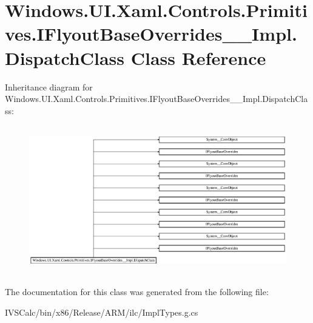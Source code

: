 \hypertarget{class_windows_1_1_u_i_1_1_xaml_1_1_controls_1_1_primitives_1_1_i_flyout_base_overrides_____impl_1_1_dispatch_class}{}\section{Windows.\+U\+I.\+Xaml.\+Controls.\+Primitives.\+I\+Flyout\+Base\+Overrides\+\_\+\+\_\+\+Impl.\+Dispatch\+Class Class Reference}
\label{class_windows_1_1_u_i_1_1_xaml_1_1_controls_1_1_primitives_1_1_i_flyout_base_overrides_____impl_1_1_dispatch_class}
Inheritance diagram for Windows.\+U\+I.\+Xaml.\+Controls.\+Primitives.\+I\+Flyout\+Base\+Overrides\+\_\+\+\_\+\+Impl.\+Dispatch\+Class\+:\begin{figure}[H]
\begin{center}
\leavevmode
\includegraphics[height=6.511628cm]{class_windows_1_1_u_i_1_1_xaml_1_1_controls_1_1_primitives_1_1_i_flyout_base_overrides_____impl_1_1_dispatch_class}
\end{center}
\end{figure}


The documentation for this class was generated from the following file\+:\begin{DoxyCompactItemize}
\item 
I\+V\+S\+Calc/bin/x86/\+Release/\+A\+R\+M/ilc/Impl\+Types.\+g.\+cs\end{DoxyCompactItemize}
